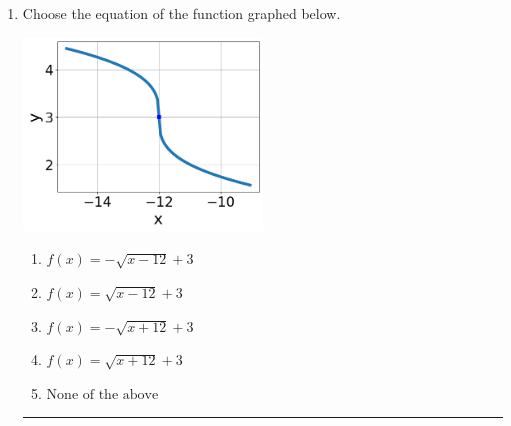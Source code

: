 \documentclass[14pt]{extbook}
\newcommand{\litem}[1]{\item#1\hspace*{-1cm}\rule{\textwidth}{0.4pt}}
\begin{document}
\begin{enumerate}
{\begin{enumerate}[label=\Alph*.]
\end{enumerate} }
\litem{
Choose the equation of the function graphed below.
\begin{center}
    \includegraphics[width=0.5\textwidth]{../Figures/radicalGraphToEquationC.png}
\end{center}
\begin{enumerate}[label=\Alph*.]
\item \( f(x) = - \sqrt{x - 12} + 3 \)
\item \( f(x) = \sqrt{x - 12} + 3 \)
\item \( f(x) = - \sqrt{x + 12} + 3 \)
\item \( f(x) = \sqrt{x + 12} + 3 \)
\item \( \text{None of the above} \)

\end{enumerate} }
\end{enumerate}
\end{document}
